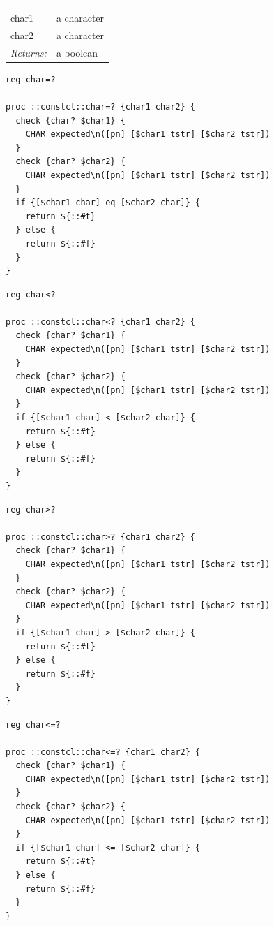 \documentclass[twoside]{report}
\begin{document}
\noindent\begin{tabular}{ |p{1.9cm} p{8cm}| }
\hline
\rowcolor[HTML]{CCCCCC} \multicolumn{2}{|l|}{\bf char=?, char<?, char>?, char<=?, char>=? (public)} \\
char1 & a character \\
char2 & a character \\
\textit{Returns:} & a boolean \\
\hline
\end{tabular}

\begin{lstlisting}
reg char=?

proc ::constcl::char=? {char1 char2} {
  check {char? $char1} {
    CHAR expected\n([pn] [$char1 tstr] [$char2 tstr])
  }
  check {char? $char2} {
    CHAR expected\n([pn] [$char1 tstr] [$char2 tstr])
  }
  if {[$char1 char] eq [$char2 char]} {
    return ${::#t}
  } else {
    return ${::#f}
  }
}
\end{lstlisting}

\begin{lstlisting}
reg char<?

proc ::constcl::char<? {char1 char2} {
  check {char? $char1} {
    CHAR expected\n([pn] [$char1 tstr] [$char2 tstr])
  }
  check {char? $char2} {
    CHAR expected\n([pn] [$char1 tstr] [$char2 tstr])
  }
  if {[$char1 char] < [$char2 char]} {
    return ${::#t}
  } else {
    return ${::#f}
  }
}
\end{lstlisting}

\begin{lstlisting}
reg char>?

proc ::constcl::char>? {char1 char2} {
  check {char? $char1} {
    CHAR expected\n([pn] [$char1 tstr] [$char2 tstr])
  }
  check {char? $char2} {
    CHAR expected\n([pn] [$char1 tstr] [$char2 tstr])
  }
  if {[$char1 char] > [$char2 char]} {
    return ${::#t}
  } else {
    return ${::#f}
  }
}
\end{lstlisting}

\begin{lstlisting}
reg char<=?

proc ::constcl::char<=? {char1 char2} {
  check {char? $char1} {
    CHAR expected\n([pn] [$char1 tstr] [$char2 tstr])
  }
  check {char? $char2} {
    CHAR expected\n([pn] [$char1 tstr] [$char2 tstr])
  }
  if {[$char1 char] <= [$char2 char]} {
    return ${::#t}
  } else {
    return ${::#f}
  }
}
\end{lstlisting}
\end{document}
